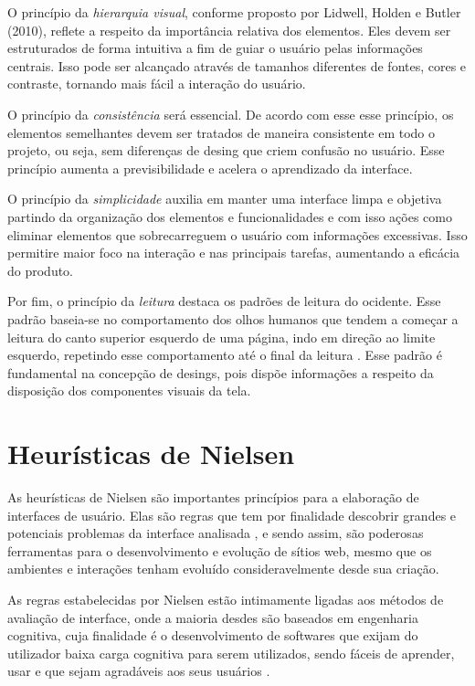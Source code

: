 O princípio da \textit{hierarquia visual}, conforme proposto por Lidwell, Holden e Butler (2010), reflete a respeito da importância relativa dos elementos. Eles devem ser estruturados de forma intuitiva a fim de guiar o usuário pelas informações centrais. Isso pode ser alcançado através de tamanhos diferentes de fontes, cores  e contraste, tornando mais fácil a interação do usuário.

O princípio da \textit{consistência} será essencial. De acordo com esse esse princípio, os elementos semelhantes devem ser tratados de maneira consistente em todo o projeto, ou seja, sem diferenças de desing que criem confusão no usuário. Esse princípio aumenta a previsibilidade e acelera o aprendizado da interface.

O princípio da \textit{simplicidade} auxilia em manter uma interface limpa e objetiva partindo da organização dos elementos e funcionalidades e com isso ações como eliminar elementos que sobrecarreguem o usuário com informações excessivas. Isso permitire maior foco na interação e nas principais tarefas, aumentando a eficácia do produto.

Por fim, o princípio da \textit{leitura} destaca os padrões de leitura do ocidente. Esse padrão baseia-se no comportamento dos olhos humanos que tendem a começar a leitura do canto superior esquerdo de uma página, indo em direção ao limite esquerdo, repetindo esse comportamento até o final da leitura \cite{lidwell2010}. Esse padrão é fundamental na concepção de desings, pois dispõe informações a respeito da disposição dos componentes visuais da tela.

\section{Heurísticas de Nielsen}

As heurísticas de Nielsen são importantes princípios para a elaboração de interfaces de usuário. Elas são regras que tem por finalidade descobrir grandes e potenciais problemas da interface analisada \cite{nielsen1994usability}, e sendo assim, são poderosas ferramentas para o desenvolvimento e evolução de sítios web, mesmo que os ambientes e interações tenham evoluído consideravelmente desde sua criação.

As regras estabelecidas por Nielsen estão intimamente ligadas aos métodos de avaliação de interface, onde a maioria desdes são baseados em engenharia cognitiva, cuja finalidade é o desenvolvimento de softwares que exijam do utilizador baixa carga cognitiva para serem utilizados, sendo fáceis de aprender, usar e que sejam agradáveis aos seus usuários \cite{maciel2004avaliacao}.

